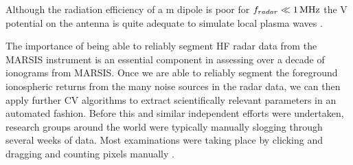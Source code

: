 Although the radiation efficiency of a \unit[40]{m} dipole is poor for $f_{radar} \ll \unit[1]{MHz}$ the \unit[400]{V} potential on the antenna is quite adequate to simulate local plasma waves \citep{morgan2013}.

The importance of being able to reliably segment HF radar data from the MARSIS instrument is an essential component in assessing over a decade of ionograms from MARSIS. 
Once we are able to reliably segment the foreground ionospheric returns from the many noise sources in the radar data, we can then apply further CV algorithms to extract scientifically relevant parameters in an automated fashion.
Before this and similar independent efforts were undertaken, research groups around the world were typically manually slogging through several weeks of data. 
Most examinations were taking place by clicking and dragging and counting pixels manually \citep{andrews2013,morgan2013}. 

